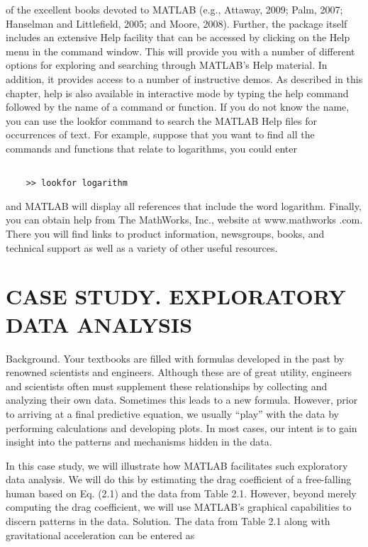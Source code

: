\documentclass[../main.tex]{subfiles}
\begin{document}
of the excellent books devoted to MATLAB (e.g., Attaway, 2009; Palm, 2007; Hanselman
and Littlefield, 2005; and Moore, 2008).
Further, the package itself includes an extensive Help facility that can be accessed by
clicking on the Help menu in the command window. This will provide you with a number
of different options for exploring and searching through MATLAB's Help material. In addition, it provides access to a number of instructive demos.
As described in this chapter, help is also available in interactive mode by typing the
help command followed by the name of a command or function.
If you do not know the name, you can use the lookfor command to search the
MATLAB Help files for occurrences of text. For example, suppose that you want to find all
the commands and functions that relate to logarithms, you could enter
\begin{lstlisting}[frame=none, numbers=none]

	>> lookfor logarithm

\end{lstlisting}
and MATLAB will display all references that include the word logarithm.
Finally, you can obtain help from The MathWorks, Inc., website at www.mathworks
.com. There you will find links to product information, newsgroups, books, and technical
support as well as a variety of other useful resources.

\section{CASE STUDY. EXPLORATORY DATA ANALYSIS}


Background. Your textbooks are filled with formulas developed in the past by
renowned scientists and engineers. Although these are of great utility, engineers and scientists
often must supplement these relationships by collecting and analyzing their own data. Sometimes this leads to a new 
formula. However, prior to arriving at a final predictive equation, we
usually “play” with the data by performing calculations and developing plots. In most cases,
our intent is to gain insight into the patterns and mechanisms hidden in the data.


In this case study, we will illustrate how MATLAB facilitates such exploratory data
analysis. We will do this by estimating the drag coefficient of a free-falling human based on
Eq. (2.1) and the data from Table 2.1. However, beyond merely computing the drag
coefficient, we will use MATLAB's graphical capabilities to discern patterns in the data.
Solution. The data from Table 2.1 along with gravitational acceleration can be entered as
\end{document}
